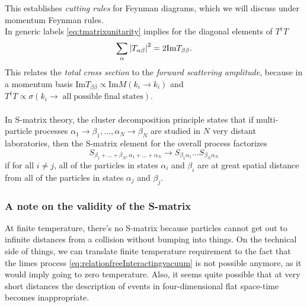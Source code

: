 This establishes \emph{cutting rules} for Feynman diagrams, which we will discuss under momentum Feynman rules.\\
In generic labels \ref{eq:tmatrixunitarity} implies for the diagonal elements of $T^\dagger T$
\begin{equation}
	\sum_\alpha \abs{T_{\alpha \beta}}^2 = 2 \mathrm{Im}T_{\beta  \beta}.
\end{equation}
This relates the \emph{total cross section} to the \emph{forward scattering amplitude}, because in a momentum basis $\mathrm{Im}T_{\beta\beta}\propto \mathrm{Im}M(k_i\rightarrow k_i)$ and $T^\dagger T\propto \sigma(k_i \rightarrow \mathrm{\;all\;possible\;final\;states})$.\\
\\
In S-matrix theory, the cluster decomposition principle states that if multi-particle processes $\alpha_1\rightarrow\beta_1,\dots,\alpha_N\rightarrow\beta_N$ are studied in $N$ very distant laboratories, then the S-matrix element for the overall process factorizes
\begin{equation*}
	S_{\beta_1+\dots + \beta_N,\alpha_1+\dots+\alpha_N}\rightarrow S_{\beta_1 \alpha_1} \dots S_{\beta_N \alpha_N} 
\end{equation*}
if for all $i\neq j$, all of the particles in states $\alpha_i$ and $\beta_i$ are at great spatial distance from all of the particles in states $\alpha_j$ and $\beta_j$.
\subsubsection{A note on the validity of the S-matrix}
At finite temperature, there’s no S-matrix because particles cannot get out to infinite distances from a collision without bumping into things. On the technical side of things, we can translate finite temperature requirement to the fact that the limes process \ref{eq:relationfreeInteractingvacuum} is not possible anymore, as it would imply going to zero temperature. Also, it seems quite possible that at very short
distances the description of events in four-dimensional flat space-time becomes inappropriate.





